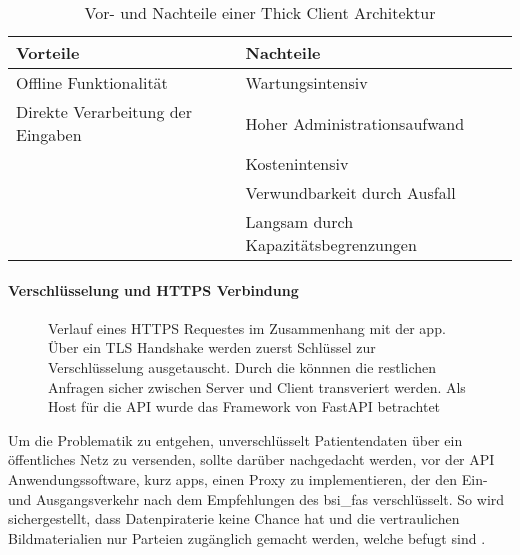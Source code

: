 \begin{table}[t]\vspace{1ex}\centering
  \begin{tabular*}{14cm}{l|l}
  \textbf{Vorteile} & \textbf{Nachteile}
  \\\hline\hline
  Offline Funktionalität             &  Wartungsintensiv               \\
  Direkte Verarbeitung der Eingaben  &  Hoher Administrationsaufwand   \\
                                     &  Kostenintensiv                 \\
                                     &  Verwundbarkeit durch Ausfall   \\
                                     &  Langsam durch Kapazitätsbegrenzungen
  \\\hline
  \end{tabular*}
  \caption[Vor- und Nachteile von Thick Client]{Vor- und Nachteile einer Thick Client Architektur}\label{cap:thickclient}
\vspace{1ex}\end{table}\label{table:thickclient}


\paragraph{Verschlüsselung und HTTPS Verbindung}\label{encryption}
\begin{figure}[t]
\begin{center}
 
\caption[FastAPI HTTPS Request Verlauf]{Verlauf eines HTTPS Requestes im Zusammenhang mit der \ac{app}. Über ein TLS Handshake werden zuerst Schlüssel zur Verschlüsselung ausgetauscht. Durch die könnnen die restlichen Anfragen sicher zwischen Server und Client transveriert werden. Als Host für die API wurde das Framework von FastAPI betrachtet \cite{fastapi}}\label{cap:fastapi}
\end{center}
\end{figure}\label{fig:fastapi}

Um die Problematik zu entgehen, unverschlüsselt Patientendaten über ein öffentliches Netz zu versenden, sollte darüber nachgedacht werden, vor der API Anwendungssoftware, kurz \Acp{app}, einen Proxy zu implementieren, der den Ein- und Ausgangsverkehr nach dem Empfehlungen des \Acp{bsi_fa} verschlüsselt. So wird sichergestellt, dass Datenpiraterie keine Chance hat und die vertraulichen Bildmaterialien nur Parteien zugänglich gemacht werden, welche befugt sind \cite{fastapi} \cite{bsi}.


